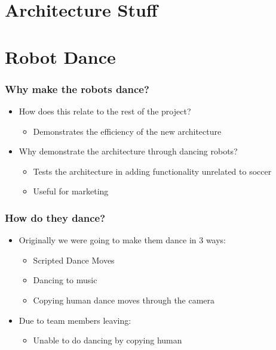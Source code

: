\documentclass{beamer}
\begin{document}
\section{Architecture Stuff}
\begin{frame}
	\sectionpage
\end{frame}

\section{Robot Dance}
	\begin{frame}
		\sectionpage %
	\end{frame}
	\begin{frame}
		\frametitle{Why make the robots dance?}
		\begin{itemize}
			\item How does this relate to the rest of the project?
			\begin{itemize}
				\item Demonstrates the efficiency of the new architecture
			\end{itemize}
			\item Why demonstrate the architecture through dancing robots?
			\begin{itemize}
				\item Tests the architecture in adding functionality unrelated to soccer
				\item Useful for marketing
			\end{itemize}
		\end{itemize}
	\end{frame}
	\begin{frame}
		\frametitle{How do they dance?}
		\begin{itemize}
			\item Originally we were going to make them dance in 3 ways:
			\begin{itemize}
				\item Scripted Dance Moves
				\item Dancing to music
				\item Copying human dance moves through the camera
			\end{itemize}
			\item Due to team members leaving:
			\begin{itemize}
				\item Unable to do dancing by copying human
			\end{itemize}
		\end{itemize}
	\end{frame}
\end{document}
